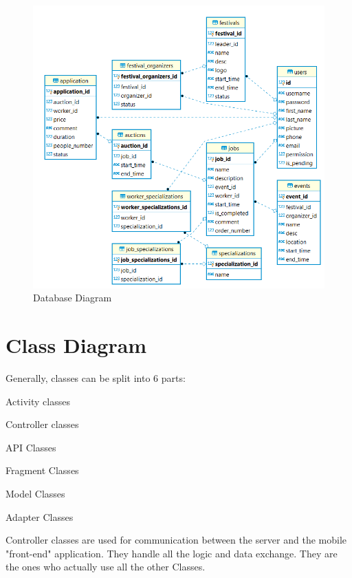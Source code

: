 \begin{figure}[H]
	\includegraphics[width=\linewidth]{diagrams/er_diagram.png}
	\centering
	\caption{Database Diagram}
	\label{fig:normal_diag}
\end{figure}

\eject

\pagebreak
\section{Class Diagram}

Generally, classes can be split into 6 parts:
\begin{packed_enum}
	\item Activity classes
	\item Controller classes
	\item API Classes
	\item Fragment Classes
	\item Model Classes
	\item Adapter Classes
\end{packed_enum}

Controller classes are used for communication between the server and the mobile "front-end" application. They handle all the logic and data exchange. They are the ones who actually use all the other Classes.

